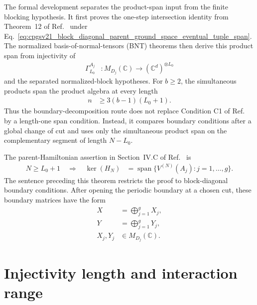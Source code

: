 \documentclass{article}
\begin{document}
The formal development separates the product-span input from the finite
blocking hypothesis. It first proves the one-step intersection identity from
Theorem~12 of Ref.~\cite{PerezGarcia2007MPSReps} under
Eq.~\ref{eq:cpgsv21_block_diagonal_parent_ground_space_eventual_tuple_span}.
The normalized basis-of-normal-tensors (BNT) theorems then derive this product
span from injectivity of
\begin{align}
  \Gamma_{L_0}^{A_j}
    &:M_{D_j}(\mathbb C)
      \longrightarrow
      (\mathbb C^d)^{\otimes L_0}
  \label{eq:cpgsv21_block_diagonal_parent_ground_space_block_injectivity}
\end{align}
and the separated normalized-block hypotheses. For $b\geq 2$, the simultaneous
products span the product algebra at every length
\begin{align}
  n
    &\geq
    3(b-1)(L_0+1).
  \label{eq:cpgsv21_block_diagonal_parent_ground_space_tuple_span_range}
\end{align}
Thus the boundary-decomposition route does not replace Condition C1 of
Ref.~\cite{PerezGarcia2007MPSReps} by a length-one span condition. Instead, it
compares boundary conditions after a global change of cut and uses only the
simultaneous product span on the complementary segment of length $N-L_0$.

The parent-Hamiltonian assertion in Section~IV.C of
Ref.~\cite{Cirac2021Matrix} is
\begin{align}
  N\geq L_0+1
    \quad\Longrightarrow\quad
  \ker(H_N)
    &=
    \operatorname{span}
    \{V^{(N)}(A_j):j=1,\ldots,g\}.
  \label{eq:cpgsv21_block_diagonal_parent_ground_space_source_kernel}
\end{align}
The sentence preceding this theorem restricts the proof to block-diagonal
boundary conditions. After opening the periodic boundary at a chosen cut,
these boundary matrices have the form
\begin{align}
  X
    &=
    \bigoplus_{j=1}^g X_j,
  \label{eq:cpgsv21_block_diagonal_parent_ground_space_boundary_x}\\
  Y
    &=
    \bigoplus_{j=1}^g Y_j,
  \label{eq:cpgsv21_block_diagonal_parent_ground_space_boundary_y}\\
  X_j,Y_j
    &\in
    M_{D_j}(\mathbb C).
  \label{eq:cpgsv21_block_diagonal_parent_ground_space_boundary_blocks}
\end{align}

\section{Injectivity length and interaction range}
\end{document}

